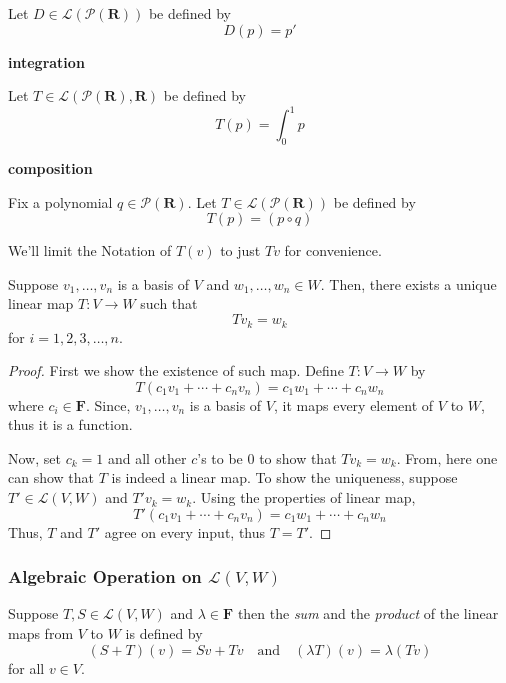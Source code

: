 Let $D \in \mathcal{L}(\mathcal{P}(\mathbf{R}))$ be defined by
\[ D(p) = p' \]

\textbf{integration}

Let $T \in \mathcal{L}(\mathcal{P}(\mathbf{R}),\mathbf{R})$ be defined by\[ T(p) = \int_0^1 p \]

\textbf{composition}

Fix a polynomial $q \in \mathcal{P}(\mathbf{R})$. Let $T \in \mathcal{L}(\mathcal{P}(\mathbf{R}))$ be defined by
\[ T(p) = (p \circ q) \]

\begin{remark}
    We'll limit the Notation of $T(v)$ to just $Tv$ for convenience.
\end{remark}


\begin{theorem}
    Suppose $v_1, \ldots, v_n$ is a basis of $V$ and $w_1, \ldots, w_n \in W$. Then, there exists a unique linear map $T: V \to W$ such that
    \[ Tv_k=w_k \]
    for $i=1,2,3,\ldots,n$.  
\end{theorem}

\begin{proof}
    First we show the existence of such map.
    Define $T : V \to W$ by
    \[ T(c_1 v_1 + \cdots + c_n v_n) = c_1 w_1 + \cdots + c_n w_n \]
    where $c_i \in \mathbf{F}$. Since, $v_1,\ldots,v_n$ is a basis of $V$, it maps every element of $V$ to $W$, thus it is a function.
    
    Now, set $c_k=1$ and all other $c$'s to be $0$ to show that $Tv_k = w_k$. From, here one can show that $T$ is indeed a linear map.
    To show the uniqueness, suppose $T' \in \mathcal{L}(V,W)$ and $T'v_k=w_k$.
    Using the properties of linear map,
    \[ T'(c_1v_1 + \cdots + c_n v_n) = c_1 w_1 + \cdots + c_n w_n \] 
    Thus, $T$ and $T'$ agree on every input, thus $T = T'$.



\end{proof}


\subsubsection{Algebraic Operation on \texorpdfstring{$\mathcal{L}(V,W)$}{mathcal{L}(V,W)}}

\begin{definition}
    Suppose $T,S \in \mathcal{L}(V,W)$ and $\lambda \in \mathbf{F}$ then the \textit{sum} and the \textit{product} of the linear maps from $V$ to $W$ is defined by
    \[ (S+T)(v) = Sv + Tv \quad \text{and} \quad (\lambda T)(v) = \lambda (Tv) \]
    for all $v \in V$.
\end{definition}

